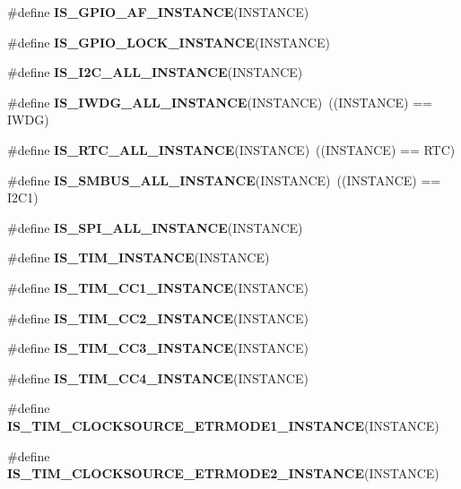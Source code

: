 \begin{DoxyCompactItemize}
\#define {\bfseries I\+S\+\_\+\+G\+P\+I\+O\+\_\+\+A\+F\+\_\+\+I\+N\+S\+T\+A\+N\+CE}(I\+N\+S\+T\+A\+N\+CE)
\item 
\#define {\bfseries I\+S\+\_\+\+G\+P\+I\+O\+\_\+\+L\+O\+C\+K\+\_\+\+I\+N\+S\+T\+A\+N\+CE}(I\+N\+S\+T\+A\+N\+CE)
\item 
\#define {\bfseries I\+S\+\_\+\+I2\+C\+\_\+\+A\+L\+L\+\_\+\+I\+N\+S\+T\+A\+N\+CE}(I\+N\+S\+T\+A\+N\+CE)
\item 
\mbox{\label{group___exported__macro_gad9ec4c52f0572ee67d043e006f1d5e39}} 
\#define {\bfseries I\+S\+\_\+\+I\+W\+D\+G\+\_\+\+A\+L\+L\+\_\+\+I\+N\+S\+T\+A\+N\+CE}(I\+N\+S\+T\+A\+N\+CE)~((I\+N\+S\+T\+A\+N\+CE) == I\+W\+DG)
\item 
\mbox{\label{group___exported__macro_gab4230e8bd4d88adc4250f041d67375ce}} 
\#define {\bfseries I\+S\+\_\+\+R\+T\+C\+\_\+\+A\+L\+L\+\_\+\+I\+N\+S\+T\+A\+N\+CE}(I\+N\+S\+T\+A\+N\+CE)~((I\+N\+S\+T\+A\+N\+CE) == R\+TC)
\item 
\mbox{\label{group___exported__macro_gaf492fcfe71eab8d1dadf4d837b840af6}} 
\#define {\bfseries I\+S\+\_\+\+S\+M\+B\+U\+S\+\_\+\+A\+L\+L\+\_\+\+I\+N\+S\+T\+A\+N\+CE}(I\+N\+S\+T\+A\+N\+CE)~((I\+N\+S\+T\+A\+N\+CE) == I2\+C1)
\item 
\#define {\bfseries I\+S\+\_\+\+S\+P\+I\+\_\+\+A\+L\+L\+\_\+\+I\+N\+S\+T\+A\+N\+CE}(I\+N\+S\+T\+A\+N\+CE)
\item 
\#define {\bfseries I\+S\+\_\+\+T\+I\+M\+\_\+\+I\+N\+S\+T\+A\+N\+CE}(I\+N\+S\+T\+A\+N\+CE)
\item 
\#define {\bfseries I\+S\+\_\+\+T\+I\+M\+\_\+\+C\+C1\+\_\+\+I\+N\+S\+T\+A\+N\+CE}(I\+N\+S\+T\+A\+N\+CE)
\item 
\#define {\bfseries I\+S\+\_\+\+T\+I\+M\+\_\+\+C\+C2\+\_\+\+I\+N\+S\+T\+A\+N\+CE}(I\+N\+S\+T\+A\+N\+CE)
\item 
\#define {\bfseries I\+S\+\_\+\+T\+I\+M\+\_\+\+C\+C3\+\_\+\+I\+N\+S\+T\+A\+N\+CE}(I\+N\+S\+T\+A\+N\+CE)
\item 
\#define {\bfseries I\+S\+\_\+\+T\+I\+M\+\_\+\+C\+C4\+\_\+\+I\+N\+S\+T\+A\+N\+CE}(I\+N\+S\+T\+A\+N\+CE)
\item 
\#define {\bfseries I\+S\+\_\+\+T\+I\+M\+\_\+\+C\+L\+O\+C\+K\+S\+O\+U\+R\+C\+E\+\_\+\+E\+T\+R\+M\+O\+D\+E1\+\_\+\+I\+N\+S\+T\+A\+N\+CE}(I\+N\+S\+T\+A\+N\+CE)
\item 
\#define {\bfseries I\+S\+\_\+\+T\+I\+M\+\_\+\+C\+L\+O\+C\+K\+S\+O\+U\+R\+C\+E\+\_\+\+E\+T\+R\+M\+O\+D\+E2\+\_\+\+I\+N\+S\+T\+A\+N\+CE}(I\+N\+S\+T\+A\+N\+CE)

\end{DoxyCompactItemize}
